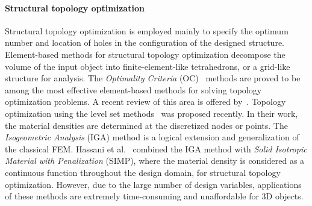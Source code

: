 \paragraph{Structural topology optimization}
%
Structural topology optimization is employed mainly to specify the optimum number and location of holes in the configuration of the designed structure.
%
Element-based methods for structural topology optimization decompose the volume of the input object into finite-element-like tetrahedrons, or a grid-like structure for analysis. The \emph{Optimality Criteria} (OC)~\cite{rozvany:1989} methods are proved to be among the most effective element-based methods for solving topology optimization problems. 
A recent review of this area is offered by~\cite{rozvany:2009}.
%
Topology optimization using the level set methods~\cite{belytschko:2003,wang2003level,Allaire:2004} was proposed recently. 
%
In their work, the material densities are determined at the discretized nodes or points. 
The \emph{Isogeometric Analysis} (IGA) method is a logical extension and generalization of the classical FEM.  
Hassani et al.~ combined the IGA method with
\emph{Solid Isotropic Material with Penalization} (SIMP), where the material density is considered as a continuous function throughout the design domain, 
for structural topology optimization. 
%
However, due to the large number of design variables, applications of these methods are extremely time-consuming and unaffordable for 3D objects.





